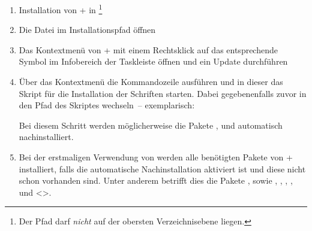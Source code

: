 \minisec{\MiKTeX+}

\begin{enumerate}
\item Installation von \MiKTeX+ in 
  \footnote{%
    Der Pfad darf \emph{nicht} auf der obersten Verzeichnisebene 
     liegen.%
  }
\item Die Datei  im Installationspfad öffnen
\item Das Kontextmenü von \MiKTeX+ mit einem Rechtsklick auf das entsprechende 
  Symbol im Infobereich der Taskleiste öffnen und ein Update durchführen
\item Über das Kontextmenü die Kommandozeile ausführen und in dieser das Skript 
  für die Installation der Schriften  starten.
  Dabei gegebenenfalls zuvor in den Pfad des Skriptes wechseln~-- exemplarisch:
  \begin{quoting}
  \RET*%
  \RET
  \end{quoting}
  Bei diesem Schritt werden möglicherweise die Pakete , 
   und  automatisch nachinstalliert.
\item Bei der erstmaligen Verwendung von \TUDScript werden alle benötigten 
  Pakete von \MiKTeX+ installiert, falls die automatische Nachinstallation 
  aktiviert ist und diese nicht schon vorhanden sind. Unter 
  anderem betrifft dies die Pakete ,  
  sowie ,  , 
  , ,  und 
  <>.
\end{enumerate}
%
%
